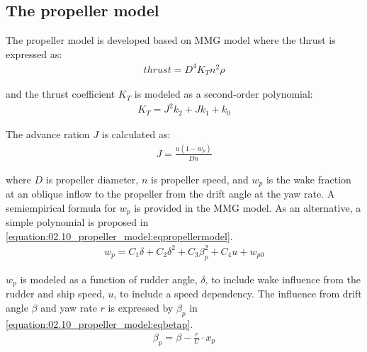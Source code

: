 \documentclass[review]{elsarticle}
\begin{document}
\subsection{The propeller model}
\label{\detokenize{02.10_propeller_model:propeller-model}}\label{\detokenize{02.10_propeller_model::doc}}
  
The propeller model is developed based on MMG model \cite{yasukawa_introduction_2015-1} where the thrust is expressed as:
\begin{equation}\label{equation:02.10_propeller_model:eqT}
\begin{split}\displaystyle thrust = D^{4} K_{T} n^{2} \rho\end{split}
\end{equation}
  
and the thrust coefficient \(K_T\) is modeled as a second-order polynomial:
\begin{equation}\label{equation:02.10_propeller_model:eqkt}
\begin{split}\displaystyle K_{T} = J^{2} k_{2} + J k_{1} + k_{0}\end{split}
\end{equation}
  
The advance ration \(J\) is calculated as:
\begin{equation}\label{equation:02.10_propeller_model:eqJ}
\begin{split}\displaystyle J = \frac{u \left(1 - w_{p}\right)}{D n}\end{split}
\end{equation}
  
where \(D\) is propeller diameter, \(n\) is propeller speed, and \(w_p\) is the wake fraction at an oblique inflow to the propeller from the drift angle at the yaw rate. A semi\sphinxhyphen{}empirical formula for \(w_p\) is provided in the MMG model. As an alternative, a simple polynomial is proposed in \autoref{equation:02.10_propeller_model:eqpropellermodel}.
\begin{equation}\label{equation:02.10_propeller_model:eqpropellermodel}
\begin{split}\displaystyle w_{p} = C_{1} \delta + C_{2} \delta^{2} + C_{3} \beta_{p}^{2} + C_{4} u + w_{p0}\end{split}
\end{equation}
  
\(w_p\) is modeled as a function of rudder angle, \(\delta\), to include wake influence from the rudder and ship speed, \(u\), to include a speed dependency. The influence from drift angle \(\beta\) and yaw rate \(r\) is expressed by \(\beta_p\) in \autoref{equation:02.10_propeller_model:eqbetap}.
\begin{equation}\label{equation:02.10_propeller_model:eqbetap}
\begin{split}\beta_p=\beta - \frac{r}{U} \cdot x_p \end{split}
\end{equation}
  
\end{document}

